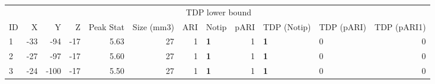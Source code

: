 
\begin{tabular}{lrrrrrrlrllr}
\toprule
\multicolumn{6}{c}{ } & \multicolumn{3}{c}{TDP lower bound} \\
\cmidrule(l{3pt}r{3pt}){7-9}
ID & X & Y & Z & Peak Stat & Size (mm3) & ARI & Notip & pARI & TDP (Notip) & TDP (pARI) & TDP (pARI1)\\
\midrule
1 & -33 & -94 & -17 & 5.63 & 27 & 1 & \textbf{1} & 1 & \textbf{1} & 0 & 0\\
2 & -27 & -97 & -17 & 5.60 & 27 & 1 & \textbf{1} & 1 & \textbf{1} & 0 & 0\\
3 & -24 & -100 & -17 & 5.50 & 27 & 1 & \textbf{1} & 1 & \textbf{1} & 0 & 0\\
\bottomrule
\end{tabular}
